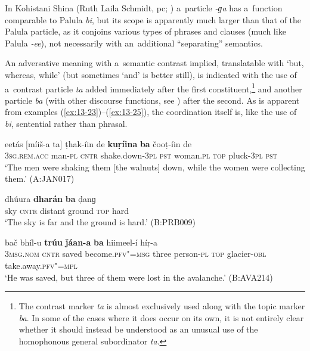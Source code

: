 In Kohistani Shina (Ruth Laila Schmidt, pc; \citealt[252]{schmidtkohistani2008}) a~particle \textit{-ɡa} has a~function comparable to Palula \textit{bi}, but its scope is apparently much larger than that of the Palula particle, as it conjoins various types of phrases and clauses (much like Palula \textit{-ee}), not necessarily with an~additional ``separating'' semantics. 


 An adversative meaning with a~semantic contrast implied, translatable with `but, whereas, while' (but sometimes `and' is better still), is indicated with the use of a~contrast particle \textit{ta} added immediately after the first constituent,\footnote{The contrast marker \textit{ta} is almost exclusively used along with the topic marker \textit{ba}. In some of the cases where it does occur on its own, it is not entirely clear whether it should instead be understood as an unusual use of the homophonous general subordinator \textit{ta}.} and another particle \textit{ba} (with other discourse functions, see ) after the second. As is apparent from examples (\ref{ex:13-23})--(\ref{ex:13-25}), the coordination itself is, like the use of \textit{bi}, sentential rather than phrasal.

\begin{exe}
\ex
\label{ex:13-23}
\gll eetás [míiš-a ta] ṭhak-íin de \textbf{kuṛíina} \textbf{ba} čooṭ-íin de\\
\textsc{3sg.rem.acc} man-\textsc{pl} \textsc{cntr} shake.down-\textsc{3pl} \textsc{pst} woman.\textsc{pl} \textsc{top} pluck-\textsc{3pl} \textsc{pst}\\
\glt `The men were shaking them [the walnuts] down, while the women were collecting them.' (A:JAN017)

\ex
\label{ex:13-24}
\gll [aaɡhaá ta] dhúura \textbf{dharán} \textbf{ba} ḍanɡ  \\
sky \textsc{cntr} distant ground \textsc{top} hard \\
\glt `The sky is far and the ground is hard.' (B:PRB009)

\ex
\label{ex:13-25}
\gll [so ta] bač bhíl-u \textbf{trúu} \textbf{ǰáan-a} \textbf{ba} hiimeel-í híṛ-a \\
\textsc{3msg.nom} \textsc{cntr} saved become.\textsc{pfv"=msg} three person-\textsc{pl} \textsc{top} glacier-\textsc{obl} take.away.\textsc{pfv"=mpl}  \\
\glt `He was saved, but three of them were lost in the avalanche.' (B:AVA214) 
\end{exe}

